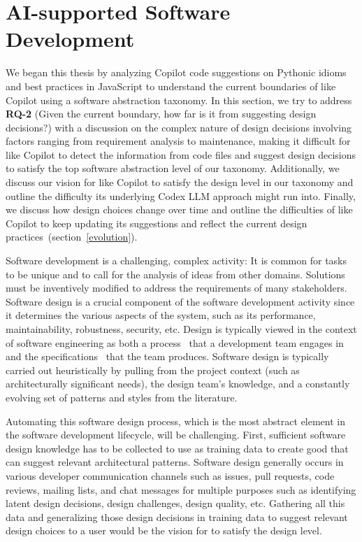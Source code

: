 \section{AI-supported Software Development}
\label{cs2design}
We began this thesis by analyzing Copilot code suggestions on Pythonic idioms and best practices in JavaScript to understand the current boundaries of \cct{} like Copilot using a software abstraction taxonomy.
In this section, we try to address \textbf{RQ-2} (Given the current boundary, how far is it from suggesting design decisions?) with a discussion on the complex nature of design decisions involving factors ranging from requirement analysis to maintenance, making it difficult for \cct{} like Copilot to detect the information from code files and suggest design decisions to satisfy the top software abstraction level of our taxonomy.
Additionally, we discuss our vision for \cct{} like Copilot to satisfy the design level in our taxonomy and outline the difficulty its underlying Codex LLM approach might run into.
Finally, we discuss how design choices change over time and outline the difficulties of \cct{} like Copilot to keep updating its suggestions and reflect the current design practices~(section~\ref{evolution}).

Software development is a challenging, complex activity: It is common for tasks to be unique and to call for the analysis of ideas from other domains. Solutions must be inventively modified to address the requirements of many stakeholders.
Software design is a crucial component of the software development activity since it determines the various aspects of the system, such as its performance, maintainability, robustness, security, etc.
Design is typically viewed in the context of software engineering as both a process~\cite{design} that a development team engages in and the specifications~\cite{designdef} that the team produces. 
Software design is typically carried out heuristically by pulling from the project context (such as architecturally significant needs), the design team's knowledge, and a constantly evolving set of patterns and styles from the literature. 

Automating this software design process, which is the most abstract element in the software development lifecycle, will be challenging. 
First, sufficient software design knowledge has to be collected to use as training data to create good \cct{} that can suggest relevant architectural patterns. 
Software design generally occurs in various developer communication channels such as issues, pull requests, code reviews, mailing lists, and chat messages for multiple purposes such as identifying latent design decisions, design challenges, design quality, etc. 
Gathering all this data and generalizing those design decisions in training data to suggest relevant design choices to a user would be the vision for \cct{} to satisfy the design level.

